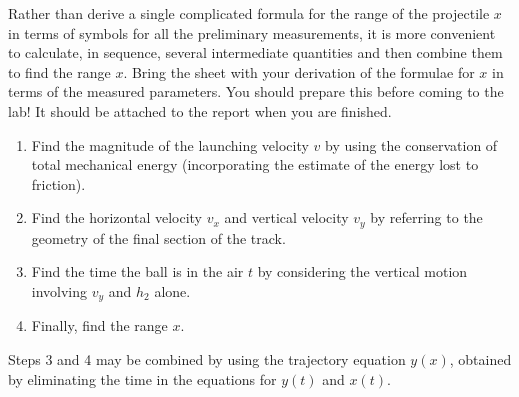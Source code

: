 Rather than derive a single complicated formula for the range of the projectile $x$ in terms of symbols for all the preliminary measurements, it is more convenient to calculate, in sequence, several intermediate quantities and then combine them to find the range $x$. Bring the sheet with your derivation of the formulae for $x$ in terms of the measured parameters. You should prepare this before coming to the lab!  It should be attached to the report when you are finished.
\begin{enumerate}
\item Find  the magnitude of the launching velocity $v$ by using the conservation of total mechanical energy (incorporating the estimate of the energy lost to friction).
\item Find the horizontal velocity $v_x$ and vertical velocity $v_y$ by referring to the geometry of the final section of the track.
\item Find the time the ball is in the air $t$ by considering the vertical motion involving $v_y$ and $h_2$ alone.
\item Finally, find the range $x$.
\end{enumerate}

Steps 3 and 4 may be combined by using the trajectory equation $y(x)$, obtained by eliminating the time in the equations for $y(t)$ and $x(t)$.\myskip

